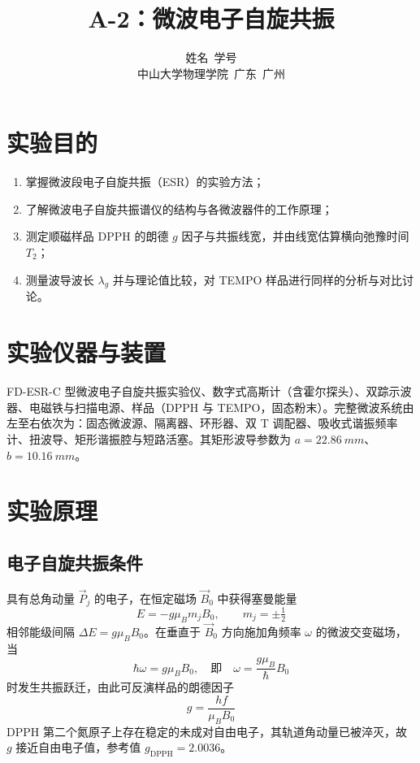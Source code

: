 \documentclass[a4paper,8pt,twocolumn]{article}
\title{
  \textbf{\huge A-2：微波电子自旋共振}
}
\author{
  姓名~学号\\
  \small 中山大学物理学院~广东~广州
}
\begin{document}
\maketitle

\section{实验目的}

\begin{enumerate}
  \item 掌握微波段电子自旋共振（ESR）的实验方法；
  \item 了解微波电子自旋共振谱仪的结构与各微波器件的工作原理；
  \item 测定顺磁样品 DPPH 的朗德 $g$ 因子与共振线宽，并由线宽估算横向弛豫时间 $T_2$；
  \item 测量波导波长 $\lambda_g$ 并与理论值比较，对 TEMPO 样品进行同样的分析与对比讨论。
\end{enumerate}

\section{实验仪器与装置}

FD-ESR-C 型微波电子自旋共振实验仪、数字式高斯计（含霍尔探头）、双踪示波器、电磁铁与扫描电源、样品（DPPH 与 TEMPO，固态粉末）。完整微波系统由左至右依次为：固态微波源、隔离器、环形器、双 T 调配器、吸收式谐振频率计、扭波导、矩形谐振腔与短路活塞。其矩形波导参数为 $a=\SI{22.86}{mm}$、$b=\SI{10.16}{mm}$。

\section{实验原理}

\subsection{电子自旋共振条件}

具有总角动量 $\vec{P}_j$ 的电子，在恒定磁场 $\vec{B}_0$ 中获得塞曼能量
\begin{equation}
  E=-g\mu_B m_j B_0,\qquad m_j=\pm\tfrac{1}{2}
  \tag{A2.1}
\end{equation}
相邻能级间隔 $\Delta E=g\mu_B B_0$。在垂直于 $\vec{B}_0$ 方向施加角频率 $\omega$ 的微波交变磁场，当
\begin{equation}
  \hbar\omega = g\mu_B B_0,\quad\text{即}\quad \omega = \frac{g\mu_B}{\hbar}B_0
  \tag{A2.2}
\end{equation}
时发生共振跃迁，由此可反演样品的朗德因子
\begin{equation}
  g=\frac{h f}{\mu_B B_0}\tag{A2.3}
\end{equation}
DPPH 第二个氮原子上存在稳定的未成对自由电子，其轨道角动量已被淬灭，故 $g$ 接近自由电子值，参考值 $g_{\text{DPPH}}=2.0036$。
\end{document}
